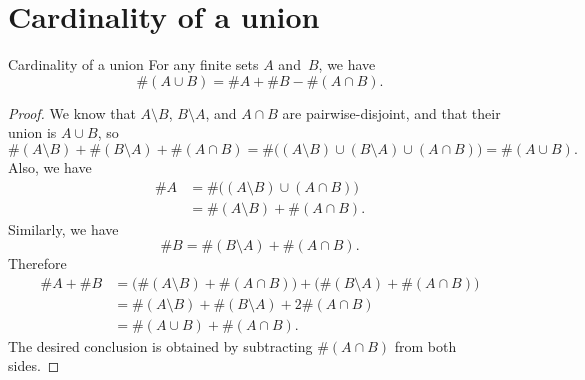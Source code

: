 \documentclass[../MATH-2000-Notes.tex]{subfiles}
\begin{document}
\section{Cardinality of a union}
\begin{Proposition}
    {Cardinality of a union}
    \label{card(AcupB)}
    For any finite sets $A$ and~$B$, we have
    $$ \#(A \cup B) = \#A + \#B - \#(A \cap B) .$$
\end{Proposition}


\begin{proof}
    We know that $A \setminus B$, $B \setminus A$, and $A \cap B$ are pairwise-disjoint, and that their union is $A\cup B$, so
    $$ \#(A \setminus B) + \#(B \setminus A) + \# (A \cap B)
        = \# \bigl( (A \setminus B) \cup (B \setminus A) \cup (A \cap B)  \bigr)
        = \# (A \cup B) .$$
    Also, we have
    \begin{align*}
        \#A
         & = \# \bigl( (A \setminus B) \cup (A \cap B) \bigr) \\
         & = 	 \#(A \setminus B) + \# (A \cap B)
        .\end{align*}
    Similarly, we have
    $$  \# B = \#(B \setminus A) + \# (A \cap B) .$$
    Therefore
    \begin{align*}
        \#A + \#B
         & = \bigl( \#(A \setminus B) + \# (A \cap B)  \bigr) + \bigl(  \#(B \setminus A) + \# (A \cap B) \bigr)
        \\&=  \#(A \setminus B) + \#(B \setminus A) + 2\# (A \cap B)
        \\&=  \#(A \cup B) + \# (A \cap B)
        .\end{align*}
    The desired conclusion is obtained by subtracting $\# (A \cap B)$ from both sides.
\end{proof}
\end{document}
